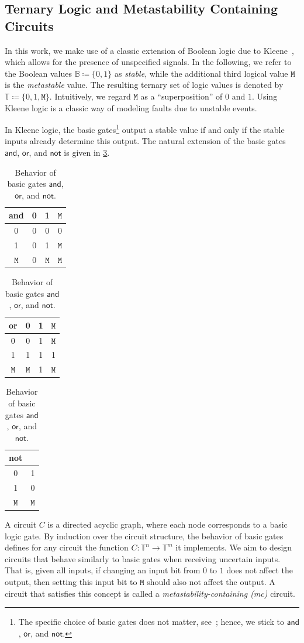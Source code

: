 \documentclass[9pt,journal,compsoc]{IEEEtran}
\theoremstyle{remark}
\newcommand{\mfu}{\mathtt{M}}
\newcommand{\IB}{\mathbb{B}}
\newcommand{\IT}{\mathbb{T}}
\newcommand{\AND}{\textsf{and}}
\newcommand{\OR}{\textsf{or}}
\newcommand{\NOT}{\textsf{not}}
\begin{document}
\subsection{Ternary Logic and Metastability Containing Circuits}\label{sec:meta}

In this work, we make use of a classic extension of Boolean logic due to
  Kleene~\cite[\S64]{kleene52meta}, which allows for the presence of unspecified
  signals.
In the following, we refer to the Boolean values $\IB\coloneqq\{0,1\}$ as
\emph{stable}, while the additional third logical value $\mfu$ is the
\emph{metastable} value.
The resulting ternary set of logic values is denoted by
$\IT\coloneqq\{0,1,\mfu\}$.
Intuitively, we regard $\mfu$ as a ``superposition'' of $0$ and $1$.
Using Kleene logic is a classic way of modeling faults due to unstable
  events.

In Kleene logic, the basic gates\footnote{The specific choice of basic gates
does not matter, see~\cite{ikenmeyer18complexity}; hence, we stick to
$\AND$, $\OR$, and $\NOT$.} output a stable value if and only if the stable
inputs already determine this output. The natural extension of the basic gates
$\AND$, $\OR$, and $\NOT$ is given in \cref{tab:gates}.

\begin{table}
  \caption{Behavior of basic gates $\AND$, $\OR$, and $\NOT$.}
  \label{tab:gates}
  \centering
  \begin{tabular}{c|ccc}
    \AND & 0 & 1 & $\mfu$\\ \hline
    0 & 0 & 0 & 0\\
    1 & 0 & 1 & $\mfu$\\
    $\mfu$ & 0 & $\mfu$ & $\mfu$
  \end{tabular}
  \qquad
  \begin{tabular}{c|ccc}
    \OR & 0 & 1 & $\mfu$\\ \hline
    0 & 0 & 1 & $\mfu$\\
    1 & 1 & 1 & 1\\
    $\mfu$ & $\mfu$ & 1 & $\mfu$
  \end{tabular}
  \qquad
  \begin{tabular}{c|c}
    \NOT &\\ \hline
    0 & 1\\
    1 & 0\\
    $\mfu$ & $\mfu$
  \end{tabular}
\end{table}

A circuit $C$ is a directed acyclic graph, where each node corresponds to a basic logic gate.
By induction over the circuit structure, the behavior of basic gates defines for
any circuit the function $C\colon \IT^n\to \IT^m$ it implements.
We aim to design circuits that behave similarly to basic gates when receiving
uncertain inputs. That is, given all inputs, if changing an input bit from $0$ to $1$ does not affect the output, then setting this input bit to $\mfu$
should also not affect the output.
A circuit that satisfies this concept is called a \emph{metastability-containing (mc)} circuit.
\end{document}
